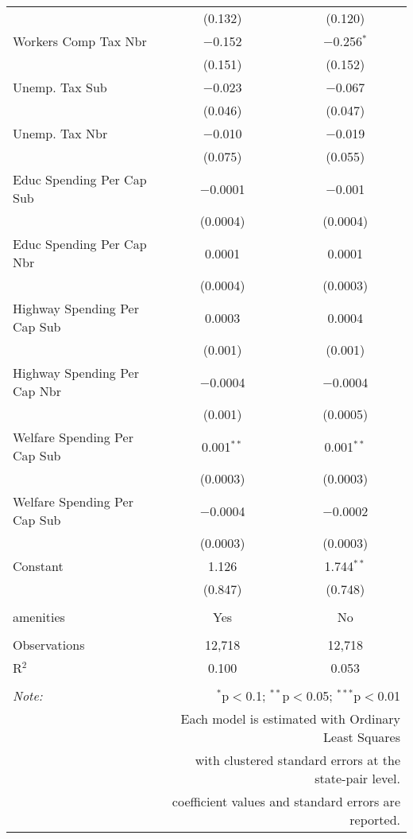 \begin{table}[!htbp]
\begin{tabular}{@{\extracolsep{5pt}}lcc}
  & (0.132) & (0.120) \\ 
  Workers Comp Tax Nbr & $-$0.152 & $-$0.256$^{*}$ \\ 
  & (0.151) & (0.152) \\ 
  Unemp. Tax Sub & $-$0.023 & $-$0.067 \\ 
  & (0.046) & (0.047) \\ 
  Unemp. Tax Nbr & $-$0.010 & $-$0.019 \\ 
  & (0.075) & (0.055) \\ 
  Educ Spending Per Cap Sub & $-$0.0001 & $-$0.001 \\ 
  & (0.0004) & (0.0004) \\ 
  Educ Spending Per Cap Nbr & 0.0001 & 0.0001 \\ 
  & (0.0004) & (0.0003) \\ 
  Highway Spending Per Cap Sub & 0.0003 & 0.0004 \\ 
  & (0.001) & (0.001) \\ 
  Highway Spending Per Cap Nbr & $-$0.0004 & $-$0.0004 \\ 
  & (0.001) & (0.0005) \\ 
  Welfare Spending Per Cap Sub & 0.001$^{**}$ & 0.001$^{**}$ \\ 
  & (0.0003) & (0.0003) \\ 
  Welfare Spending Per Cap Sub & $-$0.0004 & $-$0.0002 \\ 
  & (0.0003) & (0.0003) \\ 
  Constant & 1.126 & 1.744$^{**}$ \\ 
  & (0.847) & (0.748) \\ 
 \hline \\[-1.8ex] 
amenities & Yes & No \\ 
\hline \\[-1.8ex] 
Observations & 12,718 & 12,718 \\ 
R$^{2}$ & 0.100 & 0.053 \\ 
\hline 
\hline \\[-1.8ex] 
\textit{Note:}  & \multicolumn{2}{r}{$^{*}$p$<$0.1; $^{**}$p$<$0.05; $^{***}$p$<$0.01} \\ 
 & \multicolumn{2}{r}{Each model is estimated with Ordinary Least Squares} \\ 
 & \multicolumn{2}{r}{with clustered standard errors at the state-pair level.} \\ 
 & \multicolumn{2}{r}{coefficient values and standard errors are reported.} \\ 
\end{tabular} 
\end{table} 
